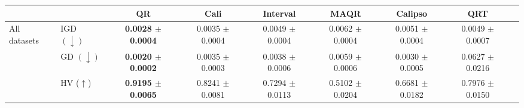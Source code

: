 \begin{tabular}{l@{\hspace{-0.1ex}}lccccccr}
\toprule
        &  & {QR} & {Cali} & {Interval} & {MAQR} & {Calipso} & {QRT} \\

\midrule
\multirow{3}{4em}{All datasets} & IGD $(\downarrow)$ & \textbf{0.0028 $\pm$ 0.0004} & 0.0035 $\pm$ 0.0004 & 0.0049 $\pm$ 0.0004 & 0.0062 $\pm$ 0.0004 & 0.0051 $\pm$ 0.0004 & 0.0049 $\pm$ 0.0007 \\
& GD $(\downarrow)$ & \textbf{0.0020 $\pm$ 0.0002} & 0.0035 $\pm$ 0.0003 & 0.0038 $\pm$ 0.0006 & 0.0059 $\pm$ 0.0006 & 0.0030 $\pm$ 0.0005 & 0.0627 $\pm$ 0.0216 \\
& HV ($\uparrow$) & \textbf{0.9195 $\pm$ 0.0065} & 0.8241 $\pm$ 0.0081 & 0.7294 $\pm$ 0.0113 & 0.5102 $\pm$ 0.0204 & 0.6681 $\pm$ 0.0182 & 0.7976 $\pm$ 0.0150 \\
\end{tabular}

